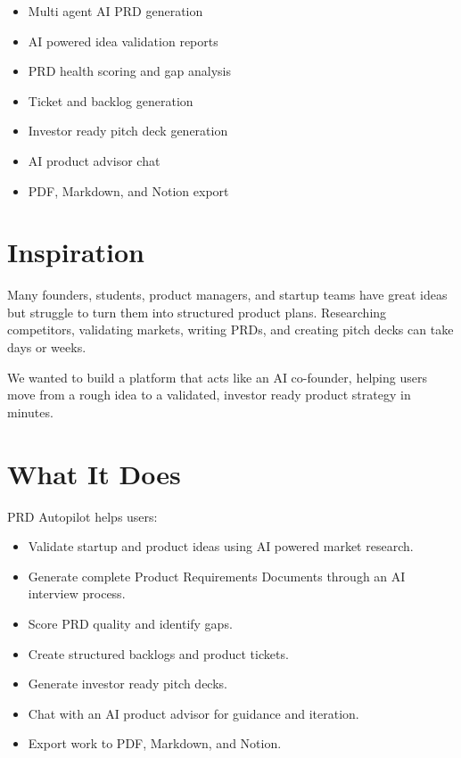 \documentclass[11pt]{article}
\begin{document}
\begin{itemize}
    \item Multi agent AI PRD generation
    \item AI powered idea validation reports
    \item PRD health scoring and gap analysis
    \item Ticket and backlog generation
    \item Investor ready pitch deck generation
    \item AI product advisor chat
    \item PDF, Markdown, and Notion export
\end{itemize}

\section{Inspiration}

Many founders, students, product managers, and startup teams have great ideas but struggle to turn them into structured product plans. Researching competitors, validating markets, writing PRDs, and creating pitch decks can take days or weeks.

We wanted to build a platform that acts like an AI co-founder, helping users move from a rough idea to a validated, investor ready product strategy in minutes.

\section{What It Does}

PRD Autopilot helps users:

\begin{itemize}
    \item Validate startup and product ideas using AI powered market research.
    \item Generate complete Product Requirements Documents through an AI interview process.
    \item Score PRD quality and identify gaps.
    \item Create structured backlogs and product tickets.
    \item Generate investor ready pitch decks.
    \item Chat with an AI product advisor for guidance and iteration.
    \item Export work to PDF, Markdown, and Notion.
\end{itemize}
\end{document}
